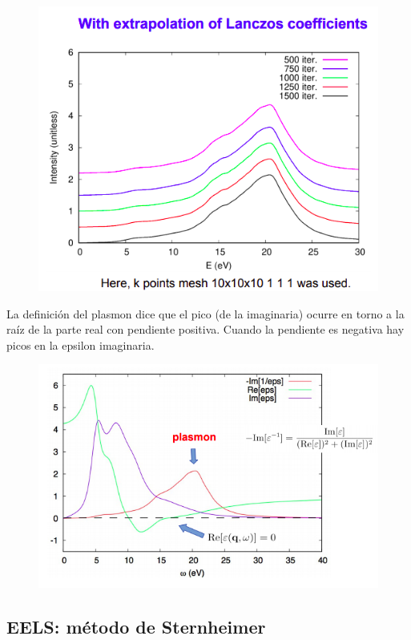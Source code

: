     \begin{figure}[H]
        \centering
        \includegraphics[scale = 0.7]{figs/D6/EELS_extra.png}
    \end{figure}

  La definición del plasmon dice que el pico (de la imaginaria) ocurre en torno a la raíz de la parte real con pendiente positiva. Cuando la pendiente es negativa hay picos en la epsilon imaginaria.
    \begin{figure}[H]
        \centering
        \includegraphics[scale = 0.7]{figs/D6/plasmon.png}
    \end{figure}

\subsection{EELS: método de Sternheimer}

